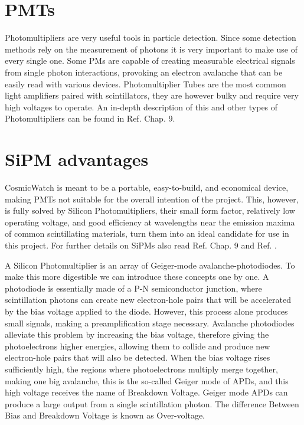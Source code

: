 \section{PMTs}

Photomultipliers are very useful tools in particle detection. Since some detection methods rely on the measurement of photons it is very important to make use of every single one. Some PMs are capable of creating measurable electrical signals from single photon interactions, provoking an electron avalanche that can be easily read with various devices. Photomultiplier Tubes are the most common light amplifiers paired with scintillators, they are however bulky and require very high voltages to operate. An in-depth description of this and other types of Photomultipliers can be found in Ref. \cite{knoll2010radiation} Chap. 9.

\section{SiPM advantages}

CosmicWatch is meant to be a portable, easy-to-build, and economical device, making PMTs not suitable for the overall intention of the project. This, however, is fully solved by Silicon Photomultipliers, their small form factor, relatively low operating voltage, and good efficiency at wavelengths near the emission maxima of common scintillating materials, turn them into an ideal candidate for use in this project. For further details on SiPMs also read Ref. \cite{knoll2010radiation} Chap. 9 and Ref. \cite{Onsemi_SiPM_intro}.

A Silicon Photomultiplier is an array of Geiger-mode avalanche-photodiodes. To make this more digestible we can introduce these concepts one by one. A photodiode is essentially made of a P-N semiconductor junction, where scintillation photons can create new electron-hole pairs that will be accelerated by the bias voltage applied to the diode. However, this process alone produces small signals, making a preamplification stage necessary. Avalanche photodiodes alleviate this problem by increasing the bias voltage, therefore giving the photoelectrons higher energies, allowing them to collide and produce new electron-hole pairs that will also be detected. When the bias voltage rises sufficiently high, the regions where photoelectrons multiply merge together, making one big avalanche, this is the so-called Geiger mode of APDs, and this high voltage receives the name of Breakdown Voltage. Geiger mode APDs can produce a large output from a single scintillation photon. The difference Between Bias and Breakdown Voltage is known as Over-voltage.

